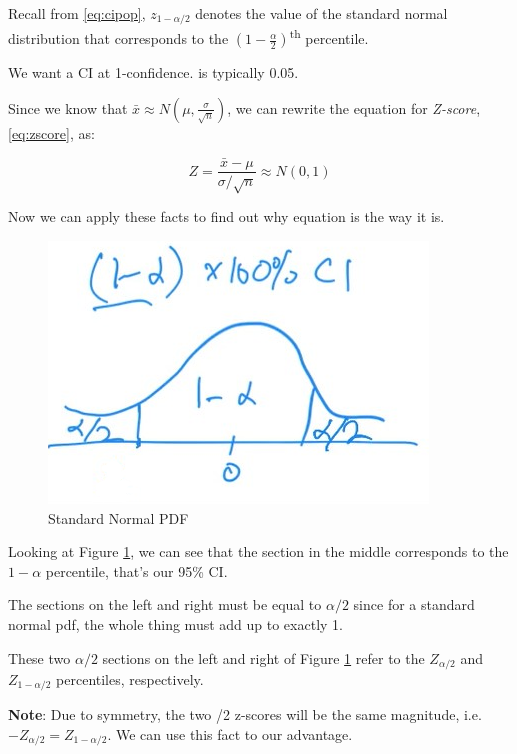\documentclass[
  openany]{book}
\begin{document}
Recall from \eqref{eq:cipop}, \(z_{1-\alpha/2}\) denotes the value of the standard normal distribution that corresponds to the \((1-\frac{\alpha}{2})\)\textsuperscript{th} percentile.

We want a CI at 1-\alpha confidence. \alpha is typically 0.05.

Since we know that \(\bar{x}\approx N(\mu,\frac{\sigma}{\sqrt{n}})\), we can rewrite the equation for \emph{Z-score}, \eqref{eq:zscore}, as:

\begin{equation}
Z=\frac{\bar{x}-\mu}{\sigma/\sqrt{n}}\approx N(0,1)
\label{eq:zstannorm}
\end{equation}

Now we can apply these facts to find out why equation is the way it is.

\begin{figure}

{\centering \includegraphics{images/standardnormpdf} 

}

\caption{Standard Normal PDF}\label{fig:stnormpdf}
\end{figure}

Looking at Figure \ref{fig:stnormpdf}, we can see that the section in the middle corresponds to the \(1-\alpha\) percentile, that's our 95\% CI.

The sections on the left and right must be equal to \(\alpha/2\) since for a standard normal pdf, the whole thing must add up to exactly 1.

These two \(\alpha/2\) sections on the left and right of Figure \ref{fig:stnormpdf} refer to the \(Z_{\alpha/2}\) and \(Z_{1-\alpha/2}\) percentiles, respectively.

\textbf{Note}: Due to symmetry, the two \alpha/2 z-scores will be the same magnitude, i.e.~\(-Z_{\alpha/2}=Z_{1-\alpha/2}\). We can use this fact to our advantage.
\end{document}
